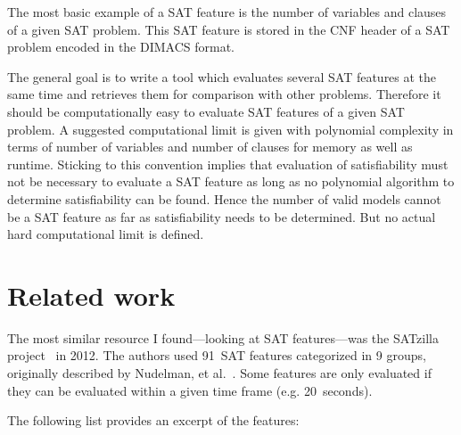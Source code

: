 The most basic example of a SAT feature is the number of variables and clauses
of a given SAT problem. This SAT feature is stored in the CNF header of a SAT
problem encoded in the DIMACS format.

The general goal is to write a tool which evaluates several SAT features at the same
time and retrieves them for comparison with other problems. Therefore it should be
computationally easy to evaluate SAT features of a given SAT problem. A suggested
computational limit is given with polynomial complexity in terms of number of
variables and number of clauses for memory as well as runtime.
Sticking to this convention implies that evaluation of satisfiability must not be
necessary to evaluate a SAT feature as long as no polynomial algorithm to determine
satisfiability can be found. Hence the number of valid models cannot be a SAT feature
as far as satisfiability needs to be determined.
But no actual hard computational limit is defined.

\section{Related work}
\label{sec:features-related}
%
The most similar resource I found---looking at SAT features---was the
SATzilla project~\cite{satzilla2004,satzilla2008} in 2012. The authors used
91~SAT features categorized in 9 groups, originally described by Nudelman,
et al.~\cite{nudelman2004understanding}. Some features are only evaluated
if they can be evaluated within a given time frame (e.g. 20~seconds).

The following list provides an excerpt of the features:

